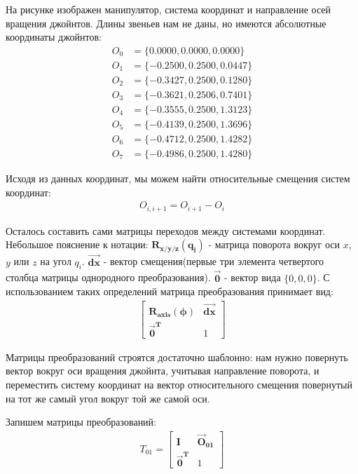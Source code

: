 На рисунке изображен манипулятор, система координат и направление осей вращения джойнтов. Длины звеньев нам не даны, но имеются абсолютные координаты джойнтов:
\begin{align*}
	O_{0} &= \{0.0000, 0.0000, 0.0000\}\\
	O_{1} &= \{-0.2500, 0.2500, 0.0447\}\\
	O_{2} &= \{-0.3427, 0.2500, 0.1280\}\\
	O_{3} &= \{-0.3621, 0.2506, 0.7401\}\\
	O_{4} &= \{-0.3555, 0.2500, 1.3123\}\\
	O_{5} &= \{-0.4139, 0.2500, 1.3696\}\\
	O_{6} &= \{-0.4712, 0.2500, 1.4282\}\\
	O_{7} &= \{-0.4986, 0.2500, 1.4280\}
\end{align*}

Исходя из данных координат, мы можем найти относительные смещения систем координат:
\begin{align*}
	O_{i, i+1} = O_{i+1} - O_{i}
\end{align*}

Осталось составить сами матрицы переходов между системами координат. Небольшое пояснение к нотации: $\boldsymbol{R_{x/y/z}(q_{i})}$ - матрица поворота вокруг оси $x$, $y$ или $z$ на угол $q_{i}$. $\boldsymbol{\vec{dx}}$ - вектор смещения(первые три элемента четвертого столбца матрицы однородного преобразования). $\boldsymbol{\vec{0}}$ - вектор вида $\{0, 0, 0\}$. С использованием таких определений матрица преобразования принимает вид:
\begin{align*}
	\begin{bmatrix}
		\boldsymbol{R_{axis}(\phi)}		&			\boldsymbol{\vec{dx}}\\
		\boldsymbol{\vec{0}^{T}}		&			1
	\end{bmatrix}
\end{align*}

Матрицы преобразований строятся достаточно шаблонно: нам нужно повернуть вектор вокруг оси вращения джойнта, учитывая направление поворота, и переместить систему координат на вектор относительного смещения повернутый на тот же самый угол вокруг той же самой оси.

Запишем матрицы преобразований:
\begin{align*}
	T_{01} = \begin{bmatrix}
		\boldsymbol{I}					&		\boldsymbol{\vec{O}_{01}}\\
		\boldsymbol{\vec{0}^{T}}		&		1
	\end{bmatrix}
\end{align*}

